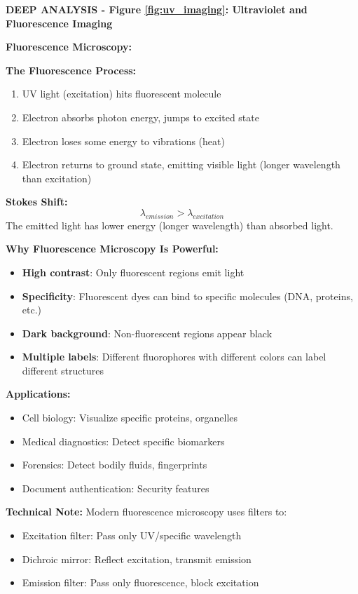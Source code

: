 \documentclass[12pt,a4paper]{article}
\begin{document}
\begin{deepexplanation}
\textbf{DEEP ANALYSIS - Figure \ref{fig:uv_imaging}: Ultraviolet and Fluorescence Imaging}

\textbf{Fluorescence Microscopy:}

\textbf{The Fluorescence Process:}
\begin{enumerate}
    \item UV light (excitation) hits fluorescent molecule
    \item Electron absorbs photon energy, jumps to excited state
    \item Electron loses some energy to vibrations (heat)
    \item Electron returns to ground state, emitting visible light (longer wavelength than excitation)
\end{enumerate}

\textbf{Stokes Shift:}
\[
\lambda_{emission} > \lambda_{excitation}
\]
The emitted light has lower energy (longer wavelength) than absorbed light.

\textbf{Why Fluorescence Microscopy Is Powerful:}
\begin{itemize}
    \item \textbf{High contrast}: Only fluorescent regions emit light
    \item \textbf{Specificity}: Fluorescent dyes can bind to specific molecules (DNA, proteins, etc.)
    \item \textbf{Dark background}: Non-fluorescent regions appear black
    \item \textbf{Multiple labels}: Different fluorophores with different colors can label different structures
\end{itemize}

\textbf{Applications:}
\begin{itemize}
    \item Cell biology: Visualize specific proteins, organelles
    \item Medical diagnostics: Detect specific biomarkers
    \item Forensics: Detect bodily fluids, fingerprints
    \item Document authentication: Security features
\end{itemize}

\textbf{Technical Note:}
Modern fluorescence microscopy uses filters to:
\begin{itemize}
    \item Excitation filter: Pass only UV/specific wavelength
    \item Dichroic mirror: Reflect excitation, transmit emission
    \item Emission filter: Pass only fluorescence, block excitation
\end{itemize}
\end{deepexplanation}
\end{document}

